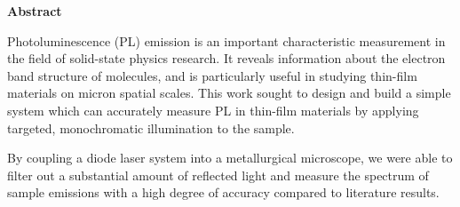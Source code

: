 \thispagestyle{plain}
\begin{center}
 
 
    \textbf{Abstract}
\end{center}

Photoluminescence (PL) emission is an important characteristic measurement in the field of solid-state physics research. It reveals information about the electron band structure of molecules, and is particularly useful in studying thin-film materials on micron spatial scales. This work sought to design and build a simple system which can accurately measure PL in thin-film materials by applying targeted, monochromatic illumination to the sample.

By coupling a diode laser system into a metallurgical microscope, we were able to filter out a substantial amount of reflected light and measure the spectrum of sample emissions with a high degree of accuracy compared to literature results.
